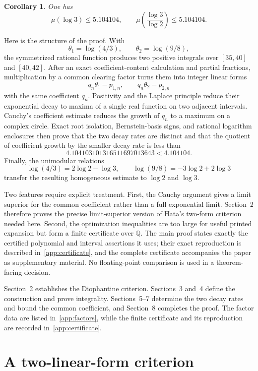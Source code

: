 \documentclass[preprint,12pt]{elsarticle}
\newtheorem{corollary}[theorem]{Corollary}
\theoremstyle{definition}
\begin{document}
\begin{corollary}\label{cor:irrationality}
One has
\[
 \mu(\log3)\le5.104104,
 \qquad
 \mu\!\left(\frac{\log3}{\log2}\right)\le5.104104.
\]
\end{corollary}

Here is the structure of the proof.  With
\[
 \theta_1=\log(4/3),\qquad \theta_2=\log(9/8),
\]
the symmetrized rational function produces two positive integrals over
$[35,40]$ and $[40,42]$.  After an exact coefficient-content calculation and
partial fractions, multiplication by a common clearing factor turns them into
integer linear forms
\[
 q_n\theta_1-p_{1,n},\qquad q_n\theta_2-p_{2,n}
\]
with the same coefficient $q_n$.  Positivity and the Laplace principle reduce
their exponential decay to maxima of a single real function on two adjacent
intervals.  Cauchy's coefficient estimate reduces the growth of $q_n$ to a
maximum on a complex circle.  Exact root isolation, Bernstein-basis signs,
and rational logarithm enclosures then prove that the two decay rates are
distinct and that the quotient of coefficient growth by the smaller decay
rate is less than
\[
 4.104103101316511697013643<4.104104.
\]
Finally, the unimodular relations
\[
 \log(4/3)=2\log2-\log3,
 \qquad
 \log(9/8)=-3\log2+2\log3
\]
transfer the resulting homogeneous estimate to $\log2$ and $\log3$.

Two features require explicit treatment.  First, the Cauchy argument gives a
limit superior for the common coefficient rather than a full exponential
limit.  Section~2 therefore proves the precise limit-superior version of
Hata's two-form criterion \cite[Lemma~2.1]{Hata1993} needed here.  Second,
the optimization inequalities are too large for useful printed expansion but
form a finite certificate over $\mathbb Q$.  The main proof states exactly the
certified polynomial and interval assertions it uses; their exact reproduction
is described in~\ref{app:certificate}, and the complete certificate accompanies
the paper as supplementary material.  No floating-point comparison is used in
a theorem-facing decision.

Section~2 establishes the Diophantine criterion.  Sections~3 and~4 define the
construction and prove integrality.  Sections~5--7 determine the two decay
rates and bound the common coefficient, and Section~8 completes the proof.
The factor data are listed in~\ref{app:factors}, while the finite certificate
and its reproduction are recorded in~\ref{app:certificate}.

\section{A two-linear-form criterion}
\end{document}
